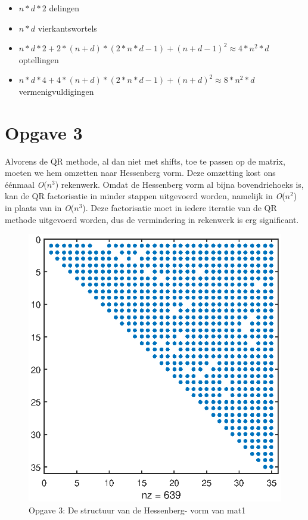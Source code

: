\documentclass[]{article}
\newcommand{\opgave}[1]{\section*{Opgave #1}}
\begin{document}
\begin{itemize}
  \item $n*d*2$ delingen
  \item $n*d$ vierkantswortels
  \item $n*d*2 + 2*(n+d)*(2*n*d-1) + (n+d-1)^2 \approx 4*n^2*d$ optellingen
  \item $n*d*4 + 4*(n+d)*(2*n*d-1) + (n+d)^2 \approx 8*n^2*d$ vermenigvuldigingen
\end{itemize}


\opgave{3}
Alvorens de QR methode, al dan niet met shifts, toe te passen op de matrix, moeten we hem omzetten naar Hessenberg vorm. Deze omzetting kost ons \'{e}\'{e}nmaal \textit{O}($n^3$) rekenwerk. \linebreak
Omdat de Hessenberg vorm al bijna bovendriehoeks is, kan de QR factorisatie in minder stappen uitgevoerd worden, namelijk in \textit{O}($n^2$) in plaats van in \textit{O}($n^3$). Deze factorisatie moet in iedere iteratie van de QR methode uitgevoerd worden, dus  de vermindering in rekenwerk is erg significant. 

\begin{figure}
\begin{center}
\includegraphics[width=1\textwidth]{opgave3.eps}
\end{center}
\caption{Opgave 3: De structuur van de Hessenberg- vorm van mat1}
\end{figure}
\end{document}
